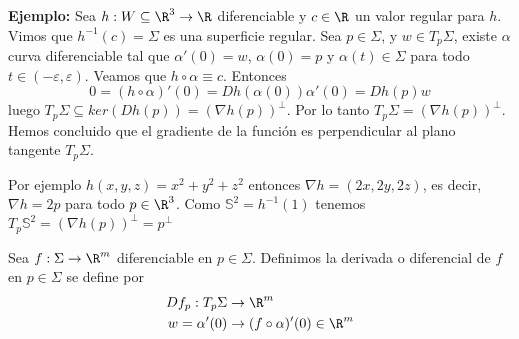 \documentclass{article}
\begin{document}
\noindent\textbf{Ejemplo:} Sea $h:W\subseteq\R^{3}\to\R$ diferenciable y $c\in\R$ un valor regular
para $h$. Vimos que $h^{-1}(c)=\Sigma$ es una superficie regular. Sea $p\in\Sigma$, y 
$w\in T_{p}{\Sigma}$, existe $\alpha$ curva diferenciable tal que $\alpha'(0)=w$, $\alpha(0)=p$ y
$\alpha(t)\in\Sigma$ para todo $t\in(-\varepsilon, \varepsilon)$. Veamos que 
$h\circ\alpha\equiv c$. Entonces
\begin{equation*}
    0=(h\circ\alpha)'(0)=Dh(\alpha(0))\alpha'(0)=Dh(p)w
\end{equation*}
luego $T_{p}\Sigma\subseteq ker(Dh(p))=(\nabla h(p))^{\perp}$. Por lo tanto $T_{p}\Sigma=
(\nabla h(p))^{\perp}$. Hemos concluido que el gradiente de la función es perpendicular al plano 
tangente $T_{p}\Sigma$.
\vspace{4mm}

\noindent Por ejemplo $h(x,y,z)=x^{2}+y^{2}+z^{2}$ entonces $\nabla h=(2x,2y,2z)$, es decir, 
$\nabla h=2p$ para todo $p\in\R^{3}$. Como $\mathbb{S}^{2}=h^{-1}(1)$ tenemos 
$T_{p}\mathbb{S}^{2}=(\nabla h(p))^{\perp}=p^{\perp}$

\begin{dfn}
    Sea $f:\Sigma\to\R^{m}$ diferenciable en $p\in\Sigma$. Definimos la derivada o diferencial de
    $f$ en $p\in\Sigma$ se define por
    \begin{align*}
        Df_{p}:T_{p}\Sigma &\to \R^{m} \\
        w=\alpha'(0) &\to (f\circ\alpha)'(0)\in\R^{m}
    \end{align*}
\end{dfn}
\end{document}
